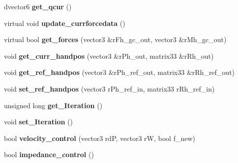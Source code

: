 \begin{DoxyCompactItemize}
\item 
\hypertarget{classhiroArm_a2b8e0d26de85f1b49bc178459f876f61}{dvector6 {\bfseries get\-\_\-qcur} ()}\label{classhiroArm_a2b8e0d26de85f1b49bc178459f876f61}

\item 
\hypertarget{classhiroArm_af33d770dbf20d3e9407db14381ca934b}{virtual void {\bfseries update\-\_\-currforcedata} ()}\label{classhiroArm_af33d770dbf20d3e9407db14381ca934b}

\item 
\hypertarget{classhiroArm_a82892b999ba5b188a77b7366fce27b0b}{virtual bool {\bfseries get\-\_\-forces} (vector3 \&r\-Fh\-\_\-gc\-\_\-out, vector3 \&r\-Mh\-\_\-gc\-\_\-out)}\label{classhiroArm_a82892b999ba5b188a77b7366fce27b0b}

\item 
\hypertarget{classhiroArm_afc2257c0efdfe06b05a5966e9953d919}{void {\bfseries get\-\_\-curr\-\_\-handpos} (vector3 \&r\-Ph\-\_\-out, matrix33 \&r\-Rh\-\_\-out)}\label{classhiroArm_afc2257c0efdfe06b05a5966e9953d919}

\item 
\hypertarget{classhiroArm_a925d818b5dca38fc993dd4935ffaade7}{void {\bfseries get\-\_\-ref\-\_\-handpos} (vector3 \&r\-Ph\-\_\-ref\-\_\-out, matrix33 \&r\-Rh\-\_\-ref\-\_\-out)}\label{classhiroArm_a925d818b5dca38fc993dd4935ffaade7}

\item 
\hypertarget{classhiroArm_a644d8a1a404c23fc512ebc6bf17a2f6c}{void {\bfseries set\-\_\-ref\-\_\-handpos} (vector3 r\-Ph\-\_\-ref\-\_\-in, matrix33 r\-Rh\-\_\-ref\-\_\-in)}\label{classhiroArm_a644d8a1a404c23fc512ebc6bf17a2f6c}

\item 
\hypertarget{classhiroArm_aeb0b11fd5c46fea119bf325b92daf5ca}{unsigned long {\bfseries get\-\_\-\-Iteration} ()}\label{classhiroArm_aeb0b11fd5c46fea119bf325b92daf5ca}

\item 
\hypertarget{classhiroArm_a7868ece4df8731426eaf7d46993c4145}{void {\bfseries set\-\_\-\-Iteration} ()}\label{classhiroArm_a7868ece4df8731426eaf7d46993c4145}

\item 
\hypertarget{classhiroArm_a4981564d8047b98beae3e25f0f67572e}{bool {\bfseries velocity\-\_\-control} (vector3 rd\-P, vector3 r\-W, bool f\-\_\-new)}\label{classhiroArm_a4981564d8047b98beae3e25f0f67572e}

\item 
\hypertarget{classhiroArm_ad68b57442891450fb9029e8c5d14520b}{bool {\bfseries impedance\-\_\-control} ()}\label{classhiroArm_ad68b57442891450fb9029e8c5d14520b}


\end{DoxyCompactItemize}
